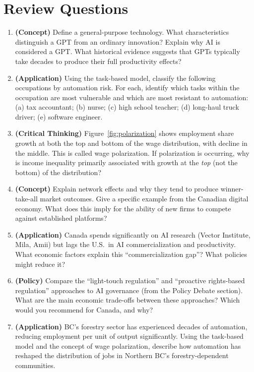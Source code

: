 \section*{Review Questions}

\begin{enumerate}

\item \textbf{(Concept)} Define a general-purpose technology. What characteristics distinguish a GPT from an ordinary innovation? Explain why AI is considered a GPT. What historical evidence suggests that GPTs typically take decades to produce their full productivity effects?

\item \textbf{(Application)} Using the task-based model, classify the following occupations by automation risk. For each, identify which tasks within the occupation are most vulnerable and which are most resistant to automation: (a) tax accountant; (b) nurse; (c) high school teacher; (d) long-haul truck driver; (e) software engineer.

\item \textbf{(Critical Thinking)} Figure~\ref{fig:polarization} shows employment share growth at both the top and bottom of the wage distribution, with decline in the middle. This is called wage polarization. If polarization is occurring, why is income inequality primarily associated with growth at the \textit{top} (not the bottom) of the distribution?

\item \textbf{(Concept)} Explain network effects and why they tend to produce winner-take-all market outcomes. Give a specific example from the Canadian digital economy. What does this imply for the ability of new firms to compete against established platforms?

\item \textbf{(Application)} Canada spends significantly on AI research (Vector Institute, Mila, Amii) but lags the U.S.\ in AI commercialization and productivity. What economic factors explain this ``commercialization gap''? What policies might reduce it?

\item \textbf{(Policy)} Compare the ``light-touch regulation'' and ``proactive rights-based regulation'' approaches to AI governance (from the Policy Debate section). What are the main economic trade-offs between these approaches? Which would you recommend for Canada, and why?

\item \textbf{(Application)} BC's forestry sector has experienced decades of automation, reducing employment per unit of output significantly. Using the task-based model and the concept of wage polarization, describe how automation has reshaped the distribution of jobs in Northern BC's forestry-dependent communities.

\end{enumerate}

